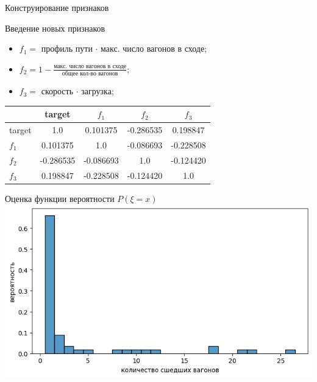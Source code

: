 \documentclass[aspectratio=169]{beamer}
\begin{document}
    \begin{frame}{Конструирование признаков}
        \begin{block}{Введение новых признаков}
            \begin{itemize}
                \item $f_1 = $ профиль пути $\cdot$ макс. число вагонов в сходе;
                \item $f_2 = 1 - \frac{\text{макс. число вагонов в сходе}}{\text{общее кол-во вагонов}}$;
                \item $f_3 = $ скорость $\cdot$ загрузка;
            \end{itemize}
        \end{block}
    
        \begin{center}
            \begin{tabular}{|l|c|c|c|c|}
                \hline
                & target & $f_1$ & $f_2$ & $f_3$ \\ \hline
                target & 1.0       & 0.101375  & -0.286535 & 0.198847  \\ \hline
                $f_1$  & 0.101375  & 1.0       & -0.086693 & -0.228508 \\ \hline
                $f_2$  & -0.286535 & -0.086693 & 1.0       & -0.124420 \\ \hline
                $f_3$  & 0.198847  & -0.228508 & -0.124420 & 1.0       \\ \hline
            \end{tabular}
        \end{center}
    \end{frame}


    \begin{frame}{Оценка функции вероятности $P(\xi = x)$}
        \centering
        \includegraphics[width=1.3\textheight]{src/KDE.png}
    \end{frame}
\end{document}
